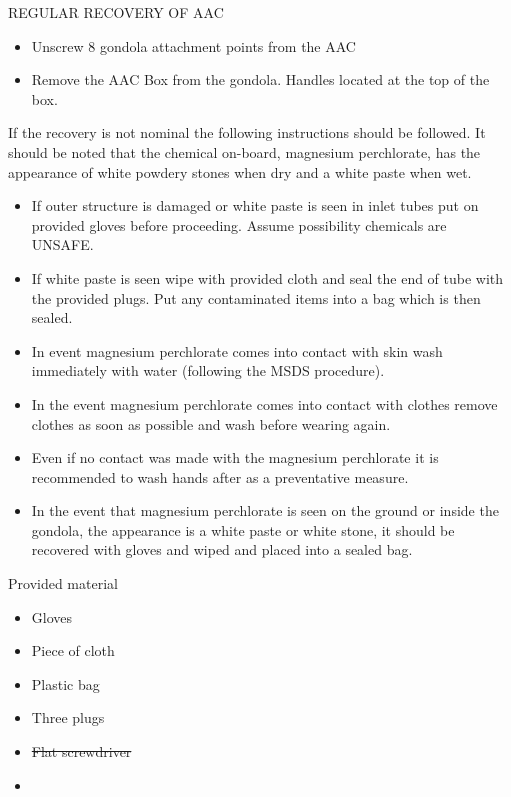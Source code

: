 \documentclass[a4paper,12pt,oneside]{article}
\providecommand{\DIFaddtex}[1]{{\protect\color{blue}\uwave{#1}}} %
\providecommand{\DIFdeltex}[1]{{\protect\color{red}\sout{#1}}}                      %
\providecommand{\DIFaddbegin}{} %
\providecommand{\DIFaddend}{} %
\providecommand{\DIFdelbegin}{} %
\providecommand{\DIFdelend}{} %
\providecommand{\DIFadd}[1]{\texorpdfstring{\DIFaddtex{#1}}{#1}} %
\providecommand{\DIFdel}[1]{\texorpdfstring{\DIFdeltex{#1}}{}} %
\newcommand{\DIFscaledelfig}{0.5}
\newlength{\DIFdelgraphicswidth} %
\newlength{\DIFdelgraphicsheight} %
\newcommand{\DIFaddincludegraphics}[2][]{{\color{blue}\fbox{\DIFOincludegraphics[#1]{#2}}}} %
\newcommand{\DIFdelincludegraphics}[2][]{%
\sbox{\DIFdelgraphicsbox}{\DIFOincludegraphics[#1]{#2}}%
\settoboxwidth{\DIFdelgraphicswidth}{\DIFdelgraphicsbox} %
\settoboxtotalheight{\DIFdelgraphicsheight}{\DIFdelgraphicsbox} %
\scalebox{\DIFscaledelfig}{%
\parbox[b]{\DIFdelgraphicswidth}{\usebox{\DIFdelgraphicsbox}\\[-\baselineskip] \rule{\DIFdelgraphicswidth}{0em}}\llap{\resizebox{\DIFdelgraphicswidth}{\DIFdelgraphicsheight}{%
\setlength{\unitlength}{\DIFdelgraphicswidth}%
\begin{picture}(1,1)%
\thicklines\linethickness{2pt} %
{\color[rgb]{1,0,0}\put(0,0){\framebox(1,1){}}}%
{\color[rgb]{1,0,0}\put(0,0){\line( 1,1){1}}}%
{\color[rgb]{1,0,0}\put(0,1){\line(1,-1){1}}}%
\end{picture}%
}\hspace*{3pt}}} %
} %
\DeclareRobustCommand{\DIFaddbegin}{\DIFOaddbegin \let\includegraphics\DIFaddincludegraphics} %
\DeclareRobustCommand{\DIFaddend}{\DIFOaddend \let\includegraphics\DIFOincludegraphics} %
\DeclareRobustCommand{\DIFdelbegin}{\DIFOdelbegin \let\includegraphics\DIFdelincludegraphics} %
\DeclareRobustCommand{\DIFdelend}{\DIFOaddend \let\includegraphics\DIFOincludegraphics} %
\begin{document}
\begin{appendices}
\DIFaddend REGULAR RECOVERY OF AAC

\begin{itemize}
    \item Unscrew 8 gondola attachment points from the AAC\DIFaddbegin \DIFadd{.
    }\DIFaddend \item Remove the AAC Box from the gondola. Handles located at the top of the box. 
\end{itemize}

If the recovery is not nominal the following instructions should be followed. It should be noted that the chemical on-board, magnesium perchlorate, has the appearance of white powdery stones when dry and a white paste when wet.

\begin{itemize}
    \item If outer structure is damaged or white paste is seen in inlet tubes put on provided gloves before proceeding. Assume possibility chemicals are UNSAFE.
    \item If white paste is seen wipe with provided cloth and seal the end of tube with the provided plugs. Put any contaminated items into a bag which is then sealed.
    \item In event magnesium perchlorate comes into contact with skin wash immediately with water (following the MSDS procedure).
    \item In the event magnesium perchlorate comes into contact with clothes remove clothes as soon as possible and wash before wearing again.
    \item Even if no contact was made with the magnesium perchlorate it is recommended to wash hands after as a preventative measure.
    \item In the event that magnesium perchlorate is seen on the ground or inside the gondola, the appearance is a white paste or white stone, it should be recovered with gloves and wiped and placed into a sealed bag.
\end{itemize}

Provided material
\begin{itemize}
    \item Gloves
    \item Piece of cloth
    \item Plastic bag
    \item Three plugs
    \item \DIFdelbegin \DIFdel{Flat screwdriver
}\DIFdelend \DIFaddbegin \DIFadd{Allen key set (at least \#3 and \#5)
    }\item \DIFadd{Clamp
}\DIFaddend \end{itemize}


\end{appendices}
\end{document}
